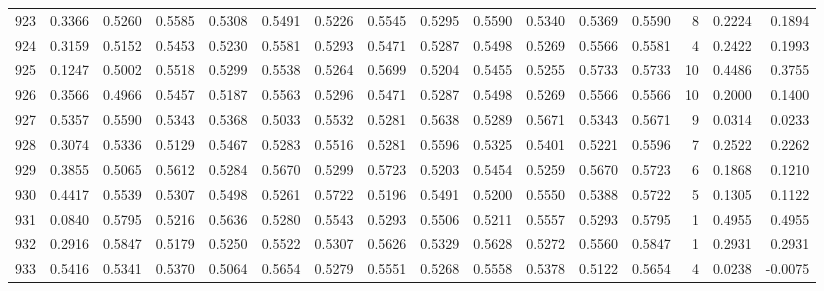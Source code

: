 \begin{tabular}{lrrrrrrrrrrrrrrr}
923 &      0.3366 &  0.5260 &  0.5585 &  0.5308 &  0.5491 &  0.5226 &  0.5545 &  0.5295 &  0.5590 &  0.5340 &   0.5369 &     0.5590 &      8 &                    0.2224 &                     0.1894 \\
924 &      0.3159 &  0.5152 &  0.5453 &  0.5230 &  0.5581 &  0.5293 &  0.5471 &  0.5287 &  0.5498 &  0.5269 &   0.5566 &     0.5581 &      4 &                    0.2422 &                     0.1993 \\
925 &      0.1247 &  0.5002 &  0.5518 &  0.5299 &  0.5538 &  0.5264 &  0.5699 &  0.5204 &  0.5455 &  0.5255 &   0.5733 &     0.5733 &     10 &                    0.4486 &                     0.3755 \\
926 &      0.3566 &  0.4966 &  0.5457 &  0.5187 &  0.5563 &  0.5296 &  0.5471 &  0.5287 &  0.5498 &  0.5269 &   0.5566 &     0.5566 &     10 &                    0.2000 &                     0.1400 \\
927 &      0.5357 &  0.5590 &  0.5343 &  0.5368 &  0.5033 &  0.5532 &  0.5281 &  0.5638 &  0.5289 &  0.5671 &   0.5343 &     0.5671 &      9 &                    0.0314 &                     0.0233 \\
928 &      0.3074 &  0.5336 &  0.5129 &  0.5467 &  0.5283 &  0.5516 &  0.5281 &  0.5596 &  0.5325 &  0.5401 &   0.5221 &     0.5596 &      7 &                    0.2522 &                     0.2262 \\
929 &      0.3855 &  0.5065 &  0.5612 &  0.5284 &  0.5670 &  0.5299 &  0.5723 &  0.5203 &  0.5454 &  0.5259 &   0.5670 &     0.5723 &      6 &                    0.1868 &                     0.1210 \\
930 &      0.4417 &  0.5539 &  0.5307 &  0.5498 &  0.5261 &  0.5722 &  0.5196 &  0.5491 &  0.5200 &  0.5550 &   0.5388 &     0.5722 &      5 &                    0.1305 &                     0.1122 \\
931 &      0.0840 &  0.5795 &  0.5216 &  0.5636 &  0.5280 &  0.5543 &  0.5293 &  0.5506 &  0.5211 &  0.5557 &   0.5293 &     0.5795 &      1 &                    0.4955 &                     0.4955 \\
932 &      0.2916 &  0.5847 &  0.5179 &  0.5250 &  0.5522 &  0.5307 &  0.5626 &  0.5329 &  0.5628 &  0.5272 &   0.5560 &     0.5847 &      1 &                    0.2931 &                     0.2931 \\
933 &      0.5416 &  0.5341 &  0.5370 &  0.5064 &  0.5654 &  0.5279 &  0.5551 &  0.5268 &  0.5558 &  0.5378 &   0.5122 &     0.5654 &      4 &                    0.0238 &                    -0.0075 \\

\end{tabular}

